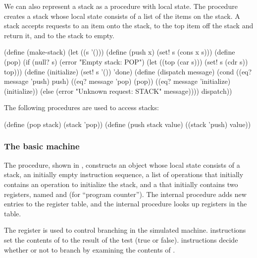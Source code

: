 We can also represent a stack as a procedure with local state.  The procedure
 creates a stack whose local state consists of a list of the
items on the stack.  A stack accepts requests to  an item onto the
stack, to  the top item off the stack and return it, and to
 the stack to empty.

\begin{codeBlock}
(define (make-stack)
  (let ((s '()))
    (define (push x) (set! s (cons x s)))
    (define (pop)
      (if (null? s)
          (error "Empty stack: POP")
          (let ((top (car s)))
            (set! s (cdr s))
            top)))
    (define (initialize)
      (set! s '())
      'done)
    (define (dispatch message)
      (cond ((eq? message 'push) push)
            ((eq? message 'pop) (pop))
            ((eq? message 'initialize) (initialize))
            (else (error "Unknown request: STACK"
                         message))))
    dispatch))
\end{codeBlock}

\noindent
The following procedures are used to access stacks:

\begin{codeBlock}
(define (pop stack) (stack 'pop))
(define (push stack value) ((stack 'push) value))
\end{codeBlock}

\subsubsection*{The basic machine}

The  procedure, shown in , constructs
an object whose local state consists of a stack, an initially empty instruction
sequence, a list of operations that initially contains an operation to
initialize the stack, and a  that initially contains
two registers, named  and  (for ``program counter'').  The
internal procedure  adds new entries to the register
table, and the internal procedure  looks up registers in
the table.

The  register is used to control branching in the simulated machine.
 instructions set the contents of  to the result of the
test (true or false).   instructions decide whether or not to
branch by examining the contents of .

